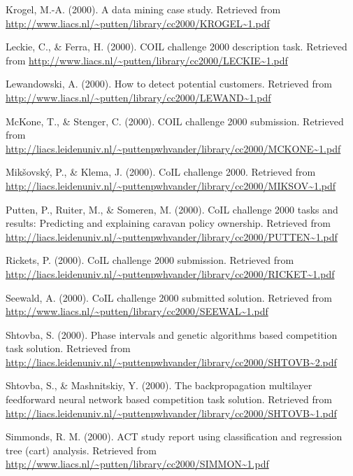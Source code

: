 \documentclass[man]{apa6}
\begin{document}
\leavevmode\hypertarget{ref-Krogel}{}%
Krogel, M.-A. (2000). A data mining case study. Retrieved from \url{http://www.liacs.nl/~putten/library/cc2000/KROGEL~1.pdf}

\leavevmode\hypertarget{ref-Leckie}{}%
Leckie, C., \& Ferra, H. (2000). COIL challenge 2000 description task. Retrieved from \url{http://www.liacs.nl/~putten/library/cc2000/LECKIE~1.pdf}

\leavevmode\hypertarget{ref-Lewandowski}{}%
Lewandowski, A. (2000). How to detect potential customers. Retrieved from \url{http://www.liacs.nl/~putten/library/cc2000/LEWAND~1.pdf}

\leavevmode\hypertarget{ref-McKone}{}%
McKone, T., \& Stenger, C. (2000). COIL challenge 2000 submission. Retrieved from \url{http://liacs.leidenuniv.nl/~puttenpwhvander/library/cc2000/MCKONE~1.pdf}

\leavevmode\hypertarget{ref-Miksovsky}{}%
Mikšovský, P., \& Klema, J. (2000). CoIL challenge 2000. Retrieved from \url{http://liacs.leidenuniv.nl/~puttenpwhvander/library/cc2000/MIKSOV~1.pdf}

\leavevmode\hypertarget{ref-Putten}{}%
Putten, P., Ruiter, M., \& Someren, M. (2000). CoIL challenge 2000 tasks and results: Predicting and explaining caravan policy ownership. Retrieved from \url{http://liacs.leidenuniv.nl/~puttenpwhvander/library/cc2000/PUTTEN~1.pdf}

\leavevmode\hypertarget{ref-Rickets}{}%
Rickets, P. (2000). CoIL challenge 2000 submission. Retrieved from \url{http://liacs.leidenuniv.nl/~puttenpwhvander/library/cc2000/RICKET~1.pdf}

\leavevmode\hypertarget{ref-Seewald}{}%
Seewald, A. (2000). CoIL challenge 2000 submitted solution. Retrieved from \url{http://www.liacs.nl/~putten/library/cc2000/SEEWAL~1.pdf}

\leavevmode\hypertarget{ref-Shtovba}{}%
Shtovba, S. (2000). Phase intervals and genetic algorithms based competition task solution. Retrieved from \url{http://liacs.leidenuniv.nl/~puttenpwhvander/library/cc2000/SHTOVB~2.pdf}

\leavevmode\hypertarget{ref-Shtovba_Mashnitskiy}{}%
Shtovba, S., \& Mashnitskiy, Y. (2000). The backpropagation multilayer feedforward neural network based competition task solution. Retrieved from \url{http://liacs.leidenuniv.nl/~puttenpwhvander/library/cc2000/SHTOVB~1.pdf}

\leavevmode\hypertarget{ref-Simmonds}{}%
Simmonds, R. M. (2000). ACT study report using classification and regression tree (cart) analysis. Retrieved from \url{http://www.liacs.nl/~putten/library/cc2000/SIMMON~1.pdf}
\end{document}
